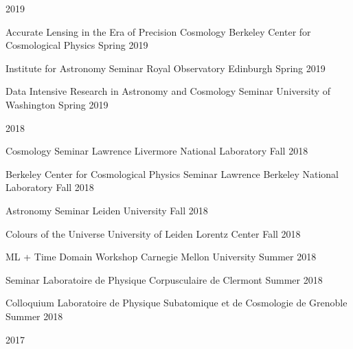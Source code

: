\documentclass[11pt,letterpaper]{article}
\begin{document}
\begin{list}{}{\malzlist}
\item 2019
\nopagebreak\begin{list}{}{\malzlist}
\item {}
  {Accurate Lensing in the Era of Precision Cosmology}
	{Berkeley Center for Cosmological Physics}
	{Spring 2019}
\item {}
  {Institute for Astronomy Seminar}
	{Royal Observatory Edinburgh}
	{Spring 2019}
\item {}
  {Data Intensive Research in Astronomy and Cosmology Seminar}
	{University of Washington}
	{Spring 2019}
	\end{list}
\item 2018
\nopagebreak\begin{list}{}{\malzlist}
\item {}
  {Cosmology Seminar}
	{Lawrence Livermore National Laboratory}
	{Fall 2018}
\item {}
  {Berkeley Center for Cosmological Physics Seminar}
	{Lawrence Berkeley National Laboratory}
	{Fall 2018}
\item {}
  {Astronomy Seminar}
	{Leiden University}
	{Fall 2018}
\item {}
	{Colours of the Universe}
	{University of Leiden Lorentz Center}
	{Fall 2018}
\item {}
  {ML + Time Domain Workshop}
	{Carnegie Mellon University}
	{Summer 2018}
\item {}
  {Seminar}
	{Laboratoire de Physique Corpusculaire de Clermont}
	{Summer 2018}
\item {}
  {Colloquium}
	{Laboratoire de Physique Subatomique et de Cosmologie de Grenoble}
	{Summer 2018}
\end{list}
\item 2017
\nopagebreak\begin{list}{}{\malzlist}
\item {}

\end{list}
\end{list}
\end{document}
